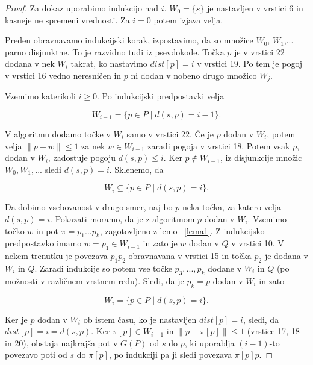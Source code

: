 \documentclass[a4paper, 12pt]{book}
\begin{document}
\begin{proof}
Za dokaz uporabimo indukcijo nad $i$. $W_0 = \{s\}$ je nastavljen v vrstici 6 in kasneje ne spremeni vrednosti. Za $i = 0$ potem izjava velja.

Preden obravnavamo indukcijski korak, izpostavimo, da so množice $W_0$, $W_1$,... parno disjunktne. To je razvidno tudi iz psevdokode. Točka $p$  je v vrstici 22 dodana v nek $W_i$ takrat, ko nastavimo $dist[p] = i$ v vrstici 19. Po tem je pogoj v vrstici 16 vedno neresničen in $p$ ni dodan v nobeno drugo množico $W_j$.

Vzemimo katerikoli $i \ge 0$. Po indukcijski predpostavki velja

\begin{equation}
W_{i-1} = \{p \in P \mid d(s,p) = i - 1\}.
\end{equation}

V algoritmu dodamo točke v $W_i$ samo v vrstici 22. Če je $p$ dodan v $W_i$, potem velja $\|p - w\| \leq 1$ za nek $w \in W_{i-1}$ zaradi pogoja v vrstici 18. Potem vsak $p$, dodan v $W_i$, zadostuje pogoju $d(s,p) \leq i$. Ker $p \notin W_{i-1}$, iz disjunkcije množic $W_0, W_1,...$ sledi $d(s,p) = i$. Sklenemo, da

\begin{equation}
W_i \subseteq \{p \in P \mid d(s,p) = i\}.
\end{equation}

Da dobimo vsebovanost v drugo smer, naj bo $p$ neka točka, za katero velja $d(s,p) = i$. Pokazati moramo, da je z algoritmom $p$ dodan v $W_i$. Vzemimo točko $w$ in pot $\pi = p_1...p_k$, zagotovljeno z lemo ~\ref{lema1}. Z indukcijsko predpostavko imamo $w = p_1 \in W_{i-1}$ in zato je $w$ dodan v $Q$ v vrstici 10. V nekem trenutku je povezava $p_1p_2$ obravnavana v vrstici 15 in točka $p_2$ je dodana v $W_i$ in $Q$. Zaradi indukcije so potem vse točke $p_3,...,p_k$ dodane v $W_i$ in $Q$ (po možnosti v različnem vrstnem redu). Sledi, da je $p_k = p$ dodan v $W_i$ in zato

\begin{equation}
W_i = \{p \in P \mid d(s,p) = i \}.
\end{equation}

Ker je $p$ dodan v $W_i$ ob istem času, ko je nastavljen $dist[p] = i$, sledi, da $dist[p] = i = d(s,p)$. Ker $\pi[p] \in W_{i-1}$ in $\|p - \pi[p] \| \leq 1$ (vrstice 17, 18 in 20), obstaja najkrajša pot v $G(P)$ od $s$ do $p$, ki uporablja $(i-1)$-to povezavo poti od $s$ do $\pi[p]$, po indukciji pa ji sledi povezava $\pi[p]p$.
\end{proof}
\end{document}

